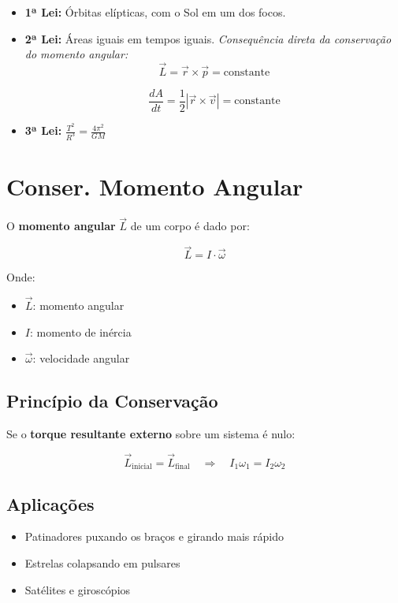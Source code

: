 \documentclass[a4paper,12pt]{article}
\begin{document}
\begin{multicols}{2}
\begin{itemize}
  \item \textbf{1ª Lei:} Órbitas elípticas, com o Sol em um dos focos.
  \item \textbf{2ª Lei:} Áreas iguais em tempos iguais. \textit{Consequência direta da 
  conservação do momento angular:}
        \[
        \vec{L} = \vec{r} \times \vec{p} = \text{constante}
        \]

        \[ \frac{dA}{dt} = \frac{1}{2} |\vec{r} \times \vec{v}| = \text{constante} \]

  \item \textbf{3ª Lei:} \( \frac{T^2}{R^3} = \frac{4 \pi^2}{GM}  \)
\end{itemize}

\section{Conser. Momento Angular}

O \textbf{momento angular} \( \vec{L} \) de um corpo é dado por:

\[
\vec{L} = I \cdot \vec{\omega}
\]

Onde:
\begin{itemize}
  \item \( \vec{L} \): momento angular
  \item \( I \): momento de inércia
  \item \( \vec{\omega} \): velocidade angular
\end{itemize}

\subsection{Princípio da Conservação}

Se o \textbf{torque resultante externo} sobre um sistema é nulo:

\[
\vec{L}_{\text{inicial}} = \vec{L}_{\text{final}}
\quad \Rightarrow \quad I_1 \omega_1 = I_2 \omega_2
\]

\subsection*{Aplicações}

\begin{itemize}
  \item Patinadores puxando os braços e girando mais rápido
  \item Estrelas colapsando em pulsares
  \item Satélites e giroscópios
\end{itemize}


\end{multicols}
\end{document}
